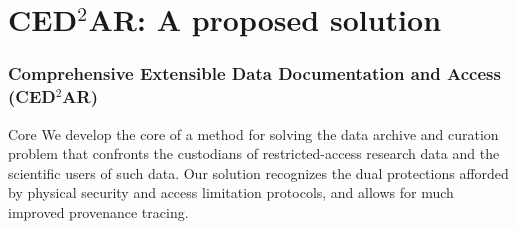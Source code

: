 

\section[Solution]{CED$^2$AR: A proposed solution}
\frame{\tableofcontents[currentsection]}


\begin{frame}
\frametitle{Comprehensive Extensible Data Documentation and Access (CED$^2$AR)}
\begin{block}{Core}
We develop the core of a method for solving the data archive
and curation problem that confronts the custodians of restricted-access
research data and the scientific users of such data. Our solution recognizes 
the dual protections afforded by physical security and access limitation protocols, and allows for 
much improved provenance tracing.
\end{block}
\end{frame}

